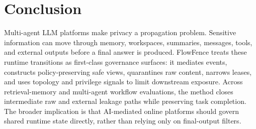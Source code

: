 \section{Conclusion}

Multi-agent LLM platforms make privacy a propagation problem. Sensitive information can move through memory, workspaces, summaries, messages, tools, and external outputs before a final answer is produced. FlowFence treats these runtime transitions as first-class governance surfaces: it mediates events, constructs policy-preserving safe views, quarantines raw content, narrows leases, and uses topology and privilege signals to limit downstream exposure. Across retrieval-memory and multi-agent workflow evaluations, the method closes intermediate raw and external leakage paths while preserving task completion. The broader implication is that AI-mediated online platforms should govern shared runtime state directly, rather than relying only on final-output filters.
